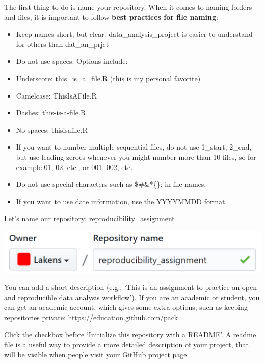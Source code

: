 \documentclass[
  oneside]{book}
\begin{document}
The first thing to do is name your repository. When it comes to naming folders
and files, it is important to follow \textbf{best practices for file naming}:

\begin{itemize}
\item
  Keep names short, but clear. data\_analysis\_project is easier to understand
  for others than dat\_an\_prjct
\item
  Do not use spaces. Options include:
\item
  Underscore: this\_is\_a\_file.R (this is my personal favorite)
\item
  Camelcase: ThisIsAFile.R
\item
  Dashes: this-is-a-file.R
\item
  No spaces: thisisafile.R
\item
  If you want to number multiple sequential files, do not use 1\_start, 2\_end,
  but use leading zeroes whenever you might number more than 10 files, so for
  example 01, 02, etc., or 001, 002, etc.
\item
  Do not use special characters such as \$\#\&*\{\}: in file names.
\item
  If you want to use date information, use the YYYYMMDD format.
\end{itemize}

Let's name our repository: reproducibility\_assignment

\begin{center}\includegraphics[width=1\linewidth]{images/5cddb5d5a5ef1b470b5d160857a71719} \end{center}

You can add a short description (e.g., `This is an assignment to practice an
open and reproducible data analysis workflow'). If you are an academic or
student, you can get an academic account, which gives some extra options, such
as keeping repositories private: \url{https://education.github.com/pack}

Click the checkbox before `Initialize this repository with a README'. A readme
file is a useful way to provide a more detailed description of your project,
that will be visible when people visit your GitHub project page.
\end{document}
